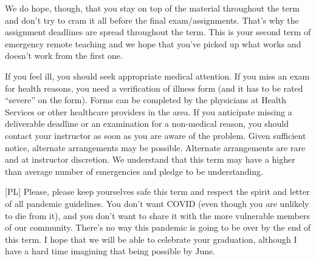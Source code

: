 \documentclass[letterpaper,10pt]{article}
\begin{document}
We do hope, though, that you stay on top of the material throughout the term and don't try to cram it all before the final exam/assignments. That's why the assignment deadlines are spread throughout the term. This is your second term of emergency remote teaching and we hope that you've picked up what works and doesn't work from the first one.



If you feel ill, you should seek appropriate medical attention. If you miss an exam for health reasons, you need a verification of illness form (and it has to be rated ``severe'' on the form). Forms can be completed by the physicians at Health Services or other healthcare providers in the area. If you anticipate missing a deliverable deadline or an examination for a non-medical reason, you should contact your instructor as soon as you are aware of the problem. Given sufficient notice, alternate arrangements may be possible. Alternate arrangements are rare and at instructor discretion. We understand that this term may have a higher than average number of emergencies and pledge to be understanding.

[PL] Please, please keep yourselves safe this term and respect the spirit and letter of all pandemic guidelines. You don't want COVID (even though you are unlikely to die from it), and you don't want to share it with the more vulnerable members of our community. There's no way this pandemic is going to be over by the end of this term. I hope that we will be able to celebrate your graduation, although I have a hard time imagining that being possible by June. 

\end{document}
